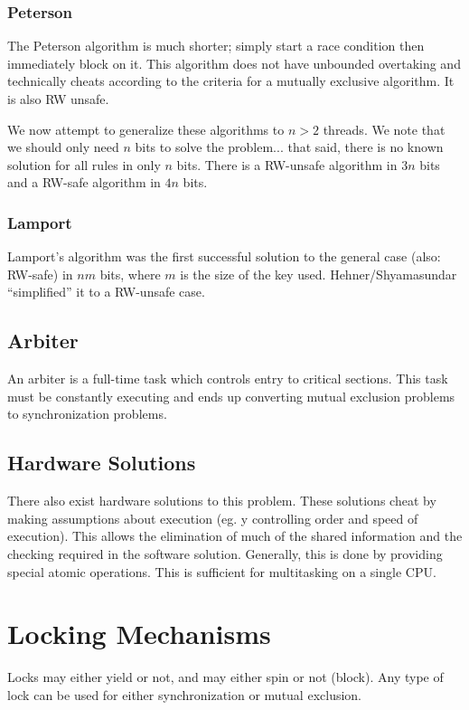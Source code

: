 \documentclass[12pt]{article}
\begin{document}
\subsubsection{Peterson}
The Peterson algorithm is much shorter; simply start a race condition then immediately block on it. This algorithm does not have unbounded overtaking and technically cheats according to the criteria for a mutually exclusive algorithm. It is also RW unsafe.

We now attempt to generalize these algorithms to $n > 2$ threads. We note that we should only need $n$ bits to solve the problem... that said, there is no known solution for all rules in only $n$ bits. There is a RW-unsafe algorithm in $3n$ bits and a RW-safe algorithm in $4n$ bits.

\subsubsection{Lamport}
Lamport's algorithm was the first successful solution to the general case (also: RW-safe) in $nm$ bits, where $m$ is the size of the key used. Hehner/Shyamasundar ``simplified'' it to a RW-unsafe case.


\subsection{Arbiter}
An arbiter is a full-time task which controls entry to critical sections. This task must be constantly executing and ends up converting mutual exclusion problems to synchronization problems.

\subsection{Hardware Solutions}
There also exist hardware solutions to this problem. These solutions cheat by making assumptions about execution (eg. y controlling order and speed of execution). This allows the elimination of much of the shared information and the checking required in the software solution. Generally, this is done by providing special atomic operations. This is sufficient for multitasking on a single CPU.

\section{Locking Mechanisms}
Locks may either yield or not, and may either spin or not (block). Any type of lock can be used for either synchronization or mutual exclusion.
\end{document}
